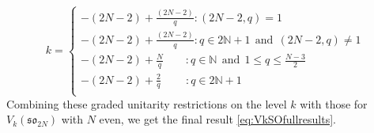 \begin{equation} \label{eq:VkSOoddgrunitresults}
k = \begin{cases}
        -(2N-2) + \frac{(2N-2)}{q}: (2N-2, q) = 1 \\
        -(2N-2) + \frac{(2N-2)}{q}: q \in 2\mathbb{N}+1 \ \ \text{and} \ \ (2N-2, q) \neq 1 \\
        -(2N-2) + \frac{N}{q} \qquad : q \in \mathbb{N} \ \ \text{and} \ \ 1 \leqslant q \leqslant \frac{N-3}{2} \\
        -(2N-2) + \frac{2}{q} \qquad \ : q \in 2\mathbb{N}+1 \\     
    \end{cases}
\end{equation}
Combining these graded unitarity restrictions on the level $k$ with those for $V_k(\mathfrak{so}_{2N})$ with $N$ even, we get the final result \eqref{eq:VkSOfullresults}.

